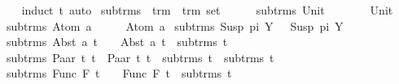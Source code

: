 \begin{isabellebody}
%
\isadelimproof
\ \ %
\endisadelimproof
%
\isatagproof
{}\isamarkupfalse%
\ {\isacharparenleft}{\kern0pt}induct\ t{\isacharparenright}{\kern0pt}\ auto%
\endisatagproof
{\isafoldproof}%
%
\isadelimproof
\isanewline
%
\endisadelimproof
\isanewline
\isanewline
\isanewline
\isanewline
{}\isamarkupfalse%
\ sub{\isacharunderscore}{\kern0pt}trms\ {\isacharcolon}{\kern0pt}{\isacharcolon}{\kern0pt}\ {\isachardoublequoteopen}trm\ {\isasymRightarrow}\ trm\ set{\isachardoublequoteclose}\isanewline
\ \ \ \isanewline
\ \ {\isachardoublequoteopen}sub{\isacharunderscore}{\kern0pt}trms\ {\isacharparenleft}{\kern0pt}Unit{\isacharparenright}{\kern0pt}\ \ \ \ \ \ \ {\isacharequal}{\kern0pt}\ {\isacharbraceleft}{\kern0pt}Unit{\isacharbraceright}{\kern0pt}{\isachardoublequoteclose}\isanewline
{\isacharbar}{\kern0pt}\ {\isachardoublequoteopen}sub{\isacharunderscore}{\kern0pt}trms\ {\isacharparenleft}{\kern0pt}Atom\ a{\isacharparenright}{\kern0pt}\ \ \ \ \ {\isacharequal}{\kern0pt}\ {\isacharbraceleft}{\kern0pt}Atom\ a{\isacharbraceright}{\kern0pt}{\isachardoublequoteclose}\isanewline
{\isacharbar}{\kern0pt}\ {\isachardoublequoteopen}sub{\isacharunderscore}{\kern0pt}trms\ {\isacharparenleft}{\kern0pt}Susp\ pi\ Y{\isacharparenright}{\kern0pt}\ \ {\isacharequal}{\kern0pt}\ {\isacharbraceleft}{\kern0pt}Susp\ pi\ Y{\isacharbraceright}{\kern0pt}{\isachardoublequoteclose}\isanewline
{\isacharbar}{\kern0pt}\ {\isachardoublequoteopen}sub{\isacharunderscore}{\kern0pt}trms\ {\isacharparenleft}{\kern0pt}Abst\ a\ t{\isacharparenright}{\kern0pt}\ \ \ {\isacharequal}{\kern0pt}\ {\isacharbraceleft}{\kern0pt}Abst\ a\ t{\isacharbraceright}{\kern0pt}\ {\isasymunion}\ sub{\isacharunderscore}{\kern0pt}trms\ t{\isachardoublequoteclose}\isanewline
{\isacharbar}{\kern0pt}\ {\isachardoublequoteopen}sub{\isacharunderscore}{\kern0pt}trms\ {\isacharparenleft}{\kern0pt}Paar\ t{}\ t{}{\isacharparenright}{\kern0pt}\ {\isacharequal}{\kern0pt}\ {\isacharbraceleft}{\kern0pt}Paar\ t{}\ t{}{\isacharbraceright}{\kern0pt}\ {\isasymunion}\ sub{\isacharunderscore}{\kern0pt}trms\ t{}\ {\isasymunion}\ sub{\isacharunderscore}{\kern0pt}trms\ t{}{\isachardoublequoteclose}\isanewline
{\isacharbar}{\kern0pt}\ {\isachardoublequoteopen}sub{\isacharunderscore}{\kern0pt}trms\ {\isacharparenleft}{\kern0pt}Func\ F\ t{\isacharparenright}{\kern0pt}\ \ \ {\isacharequal}{\kern0pt}\ {\isacharbraceleft}{\kern0pt}Func\ F\ t{\isacharbraceright}{\kern0pt}\ {\isasymunion}\ sub{\isacharunderscore}{\kern0pt}trms\ t{\isachardoublequoteclose}\isanewline

\end{isabellebody}
